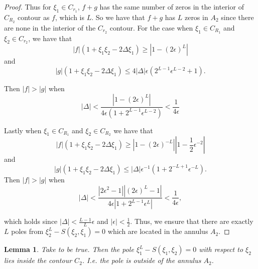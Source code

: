 \documentclass[a4paper,11pt]{article}
\newtheorem{lemma}[theorem]{Lemma}
\theoremstyle{definition}
\begin{document}
\begin{proof}
Thus for $\xi_1\in C_{r_1}$, $f+g$ has the same number of zeros in the interior of $C_{R_2}$ contour as $f$, which is $L$. So we have that $f+g$ has $L$ zeros in $A_2$ since there are none in the interior of the $C_{r_2}$ contour. For the case when $\xi_1\in C_{R_1}$ and $\xi_2\in C_{r_2}$, we have that 
\begin{equation}
    |f|(1+\xi_1\xi_2-2\Delta\xi_1)\geq \left| 1 - (2\epsilon)^L\right|
\end{equation}
and 
\begin{equation}
    |g|(1+\xi_1\xi_2-2\Delta\xi_1) \leq 4|\Delta|\epsilon\left(2^{L-1}\epsilon^{L-2}+1\right). 
\end{equation}

Then $|f| > |g|$ when 
\begin{equation}
    |\Delta| < \frac{\left|1-(2\epsilon)^L\right|}{4\epsilon\left(1+2^{L-1}\epsilon^{L-2}\right)}< \frac{1}{4\epsilon}
\end{equation}

Lastly when $\xi_1\in C_{R_1}$ and $\xi_2\in C_{R_2}$ we have that 
\begin{equation}
    |f|(1+\xi_1\xi_2-2\Delta\xi_1) \geq \left|1-(2\epsilon)^{-L}\right|\left|1-\frac12\epsilon^{-2}\right|
\end{equation}
and 
\begin{equation}
    |g|(1+\xi_1\xi_2-2\Delta\xi_1)\leq |\Delta|\epsilon^{-1}\left(1+2^{-L+1}\epsilon^{-L}\right).
\end{equation}
Then $|f|>|g|$ when 
\begin{equation}
    |\Delta|<\frac{\left|2\epsilon^2-1\right|\left|(2\epsilon)^L-1\right|}{4\epsilon\left|1+2^{L-1}\epsilon^L\right|}<\frac{1}{4\epsilon},
\end{equation}

which holds since $|\Delta|<\frac{L-1}{L}\epsilon$ and $|\epsilon|<\frac12$. Thus, we ensure that there are exactly $L$ poles from $\xi_2^L-S(\xi_2,\xi_1)=0$ which are located in the annulus $A_2$. 
\end{proof}

\begin{lemma} \label{l: noncontributing pole}
    Take  to be true. Then the pole $\xi_1^L-S(\xi_1,\xi_2)=0$ with respect to $\xi_2$ lies inside the contour $C_2$. I.e. the pole is outside of the annulus $A_2$.
\end{lemma}
\end{document}
